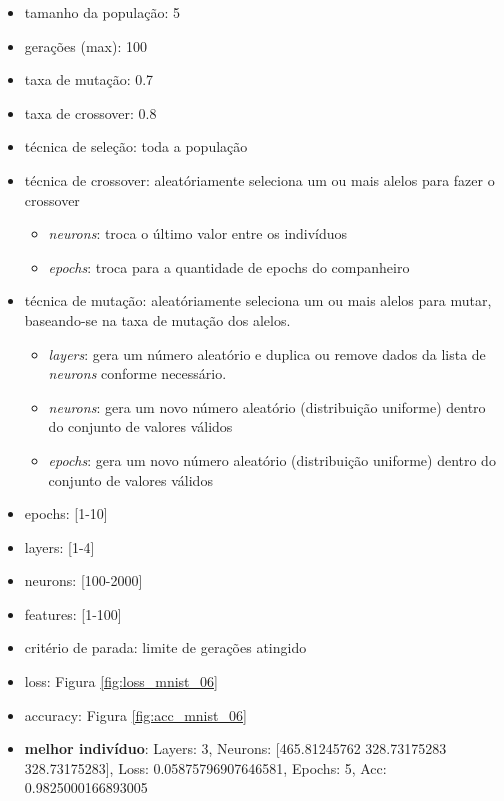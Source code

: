 \documentclass[twoside,conference,a4paper]{IEEEtran}
\begin{document}
\begin{itemize}
    \item tamanho da população: 5
    \item gerações (max): 100
    \item taxa de mutação: 0.7
    \item taxa de crossover: 0.8
    \item técnica de seleção: toda a população
    \item técnica de crossover: aleatóriamente seleciona um ou mais alelos para fazer o crossover
    \begin{itemize}
        \item \emph{neurons}: troca o último valor entre os indivíduos
        \item \emph{epochs}: troca para a quantidade de epochs do companheiro
    \end{itemize}
    \item técnica de mutação: aleatóriamente seleciona um ou mais alelos para mutar, baseando-se na taxa de mutação dos alelos.
    \begin{itemize}
        \item \emph{layers}: gera um número aleatório e duplica ou remove dados da lista de \emph{neurons} conforme necessário.
        \item \emph{neurons}: gera um novo número aleatório (distribuição uniforme) dentro do conjunto de valores válidos
        \item \emph{epochs}: gera um novo número aleatório (distribuição uniforme) dentro do conjunto de valores válidos
    \end{itemize}
    \item epochs: [1-10]
    \item layers: [1-4]
    \item neurons: [100-2000]
    \item features: [1-100]
    \item critério de parada: limite de gerações atingido
    \item loss: Figura \ref{fig:loss_mnist_06}
    \item accuracy: Figura \ref{fig:acc_mnist_06}
    \item \textbf{melhor indivíduo}: Layers: 3, Neurons: [465.81245762 328.73175283 328.73175283], Loss: 0.05875796907646581, Epochs: 5, Acc: 0.9825000166893005
\end{itemize}
\end{document}
